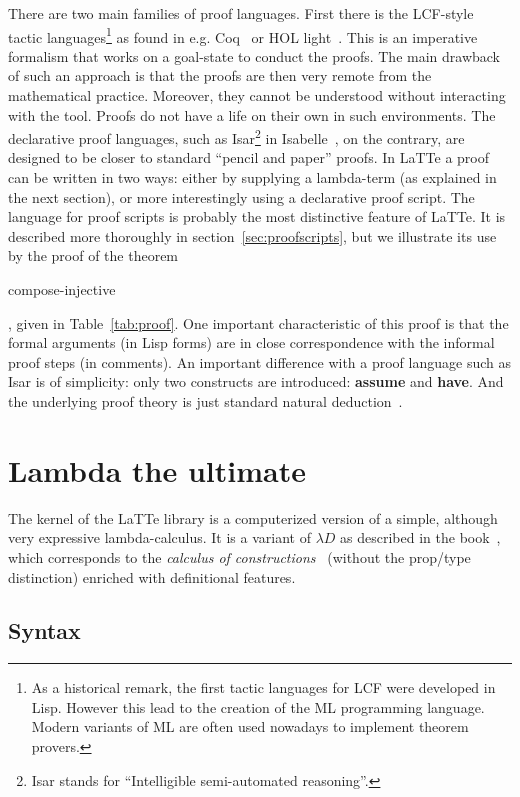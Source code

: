 \documentclass{styles/sig-alternate-05-2015}
\newcommand{\kw}[1]{\textbf{#1}}
\newcommand{\code}[1]{\begin{sffamily}{\small #1}\end{sffamily}}
\begin{document}
There are two main families of proof languages. First there is the
LCF-style tactic languages\footnote{As a historical remark, the first tactic languages
  for LCF were developed in Lisp. However this lead to the creation of the
  ML programming language. Modern variants of ML are often used nowadays to implement
 theorem provers.} as found in e.g. Coq~\cite{coq} or HOL light~\cite{harrison-hollight}.
This is an imperative formalism that works on a goal-state to conduct the
proofs. The main drawback of such an approach is that the proofs are
then very remote from the mathematical practice. Moreover, they cannot be
understood without interacting with the tool. Proofs do not have a life on their
 own in such environments. The declarative proof
languages, such as Isar\footnote{Isar stands for ``Intelligible semi-automated reasoning''.} in Isabelle~\cite{isabelle:book}, on the
contrary, are designed to be closer to standard ``pencil and paper''
proofs.  In LaTTe a proof can be written in two ways: either by
supplying a lambda-term (as explained in the next section), or more
interestingly using a declarative proof script. The language for proof
scripts is probably the most distinctive feature of LaTTe. It is
described more thoroughly in section~\ref{sec:proofscripts}, but we
illustrate its use by the proof of the theorem
\code{compose-injective}, given in Table~\ref{tab:proof}.  One
 important characteristic of this proof is that the formal arguments
(in Lisp forms) are in close correspondence with the informal proof
steps (in comments). An important difference with a
proof language such as Isar is of simplicity: only two
constructs are introduced: \kw{assume} and \kw{have}. And the underlying proof theory
is just standard natural deduction~\cite{natural-deduc:history}.

\section{Lambda the ultimate}
  \label{sec:latte}

The kernel of the LaTTe library is a computerized version of a
simple, although very expressive lambda-calculus. It is a variant
of $\lambda D$ as described in the book~\cite{book:type-theory2014}, which
corresponds to the \emph{calculus of constructions}~\cite{coc88} (without the prop/type distinction) enriched
 with definitional features.

\subsection{Syntax}
\end{document}
